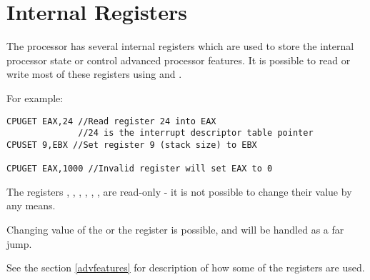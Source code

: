 \newcommand{\regentry}[3]{\texttt{#1} & \texttt{#2} & #3 \\ \hline}

\chapter{Internal Registers}
The processor has several internal registers which are used to store the internal processor state or control advanced processor features. It is possible to read or write most of these registers using  and .

For example:

\begin{verbatim}
CPUGET EAX,24 //Read register 24 into EAX 
              //24 is the interrupt descriptor table pointer
CPUSET 9,EBX //Set register 9 (stack size) to EBX

CPUGET EAX,1000 //Invalid register will set EAX to 0
\end{verbatim}

The registers , , , , , ,  are read-only - it is not possible to change their value by any means.

Changing value of the  or the  register is possible, and will be handled as a far jump.

See the section \ref{advfeatures} for description of how some of the registers are used.


